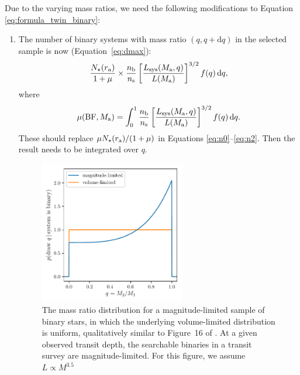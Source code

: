 \documentclass[12pt,modern]{aastex61}
\renewcommand{\a}{_{\rm a}}
\begin{document}
Due to the varying mass ratios, we need the following modifications to Equation
\ref{eq:formula_twin_binary}:
\begin{enumerate}
%
  \item The number of binary systems with mass ratio $(q,
  q+\mathrm{d}q)$ in the selected sample is now
  (Equation~\ref{eq:dmax}):
  \begin{equation}
      {N_\star(r\a)\over{1+\mu}}\times {n_{\rm b}\over n_{\rm s}}
      \left[{L_{\rm sys}(M\a, q) \over L(M\a)}\right]^{3/2}
      f(q)\,\mathrm{d}q,
  \end{equation}
  where
  \begin{equation}
      \mu({\rm BF},M\a)= 
      \int_0^1 {n_{\rm b}\over n_{\rm s}}\left[{L_{\rm sys}(M\a, q)
      \over L(M\a)}\right]^{3/2} f(q)\,\mathrm{d}q.
      \label{eq:mu_general}
  \end{equation}
  These should replace ${\mu N_\star(r\a)/(1+\mu)}$ in Equations
  \ref{eq:n0}--\ref{eq:n2}. Then the result needs to be integrated
  over $q$.

  \begin{figure}[!tb]
      \centering
      \includegraphics[width=0.6\textwidth]{figures/mass_ratio_distribution.pdf}
      \caption{
          The mass ratio distribution for a magnitude-limited sample of
          binary stars, in which the underlying volume-limited
          distribution is uniform, qualitatively similar to Figure~16 of
          \citet{raghavan_survey_2010}.  At a given observed transit
          depth, the searchable binaries in a transit survey are
          magnitude-limited. For this figure, we assume $L\propto
          M^{3.5}$
      }
      \label{fig:q_distribn_mag_limited}
  \end{figure}


\end{enumerate}
\end{document}
